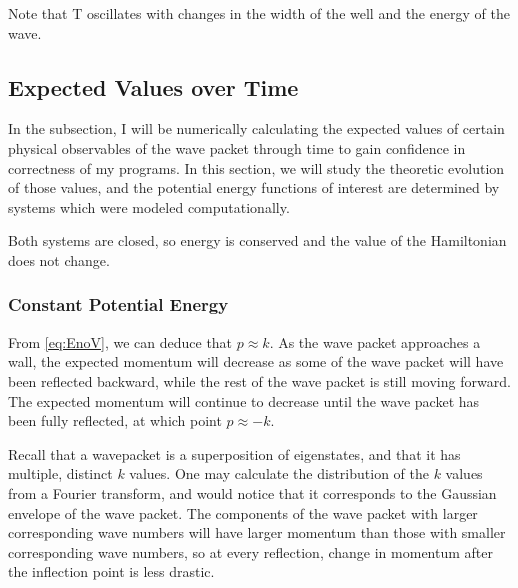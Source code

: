 \documentclass[letterpaper,12pt]{article}
\begin{document}
    \begin{center}
    \end{center}

    Note that T oscillates with changes in the width of the well and the energy
    of the wave.

    \subsection*{Expected Values over Time}
    \label{sec:expected}

    In the  subsection, I will be numerically calculating
    the expected values of certain physical observables of the wave packet
    through time to gain confidence in correctness of my programs. In this
    section, we will study the theoretic evolution of those values, and the
    potential energy functions of interest are determined by systems which were
    modeled computationally.

    Both systems are closed, so energy is conserved and the value of the
    Hamiltonian does not change.

    \subsubsection*{Constant Potential Energy}

    From \eqref{eq:EnoV}, we can deduce that $p \approx k$. As the wave packet
    approaches a wall, the expected momentum will decrease as some of the wave
    packet will have been reflected backward, while the rest of the wave packet
    is still moving forward. The expected momentum will continue to decrease
    until the wave packet has been fully reflected, at which point $p \approx
    -k$.

    Recall that a wavepacket is a superposition of
    eigenstates, and that it has multiple, distinct $k$ values. One may
    calculate the distribution of the $k$ values from a Fourier transform, and
    would notice that it corresponds to the Gaussian envelope of the wave
    packet. The components of the wave
    packet with larger corresponding wave numbers will have larger momentum than
    those with smaller corresponding wave numbers, so at every reflection,
    change in momentum after the inflection point is less drastic.
\end{document}
